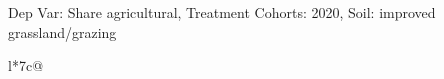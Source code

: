 \begin{table}[H]
\captionlistentry[table]{}
\label{table:beaver_land_class_DVis_land_class_1_SCg3_SSIGRG}
\scriptsize %
Dep Var: Share agricultural, Treatment Cohorts: 2020, Soil: improved grassland/grazing \\
\begin{threeparttable}
\begin{tabulary}{\textwidth}{l*{7}{c}@{}}
\toprule \toprule
\noalign{\smallskip}
\noalign{\smallskip}
\midrule \bottomrule
\end{tabulary}
\medskip
\end{threeparttable}
\end{table}
